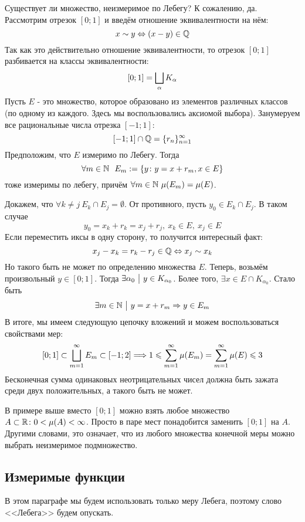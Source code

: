 \begin{example}
	Существует ли множество, неизмеримое по Лебегу? К сожалению, да. Рассмотрим отрезок $[0; 1]$ и введём отношение эквивалентности на нём:
	\[
		x \sim y \Leftrightarrow (x - y) \in \mathbb{Q}
	\]
	Так как это действительно отношение эквивалентности, то отрезок $[0; 1]$ разбивается на классы эквивалентности:
	\[
		[0; 1] = \bigsqcup_{\alpha} K_\alpha
	\]
	Пусть $E$ - это множество, которое образовано из элементов различных классов (по одному из каждого. Здесь мы воспользовались аксиомой выбора). Занумеруем все рациональные числа отрезка $[-1; 1]$:
	\[
		[-1; 1] \cap \mathbb{Q} = \{r_n\}_{n = 1}^\infty
	\]
	Предположим, что $E$ измеримо по Лебегу. Тогда
	\[
		\forall m \in \N\ \ E_m := \{y \colon y = x + r_m, x \in E\}
	\]
	тоже измеримы по лебегу, причём $\forall m \in \mathbb{N}\ \mu(E_m) = \mu(E)$.
	
	Докажем, что $\forall k \neq j\ E_k \cap E_j = \emptyset$. От противного, пусть $y_0 \in E_k \cap E_j$. В таком случае
	\[
		y_0 = x_k + r_k = x_j + r_j,\ x_k \in E,\ x_j \in E
	\]
	Если переместить иксы в одну сторону, то получится интересный факт:
	\[
		x_j - x_k = r_k - r_j \in \mathbb{Q} \Leftrightarrow x_j \sim x_k
	\]
	Но такого быть не может по определению множества $E$. Теперь, возьмём произвольный $y \in [0; 1]$. Тогда $\exists \alpha_0 \ \big|\  y \in K_{\alpha_0}$. Более того, $\exists x \in E \cap K_{\alpha_0}$. Стало быть
	\[
		\exists m \in \mathbb{N} \ \big|\  y = x + r_m \Rightarrow y \in E_m
	\]
	В итоге, мы имеем следующую цепочку вложений и можем воспользоваться свойствами мер:
	\[
		[0; 1] \subset \bigsqcup_{m = 1}^\infty E_m \subset [-1; 2] \Longrightarrow 1 \leqslant \sum_{m = 1}^\infty \mu(E_m) = \sum_{m = 1}^\infty \mu(E) \leqslant 3
	\]
	Бесконечная сумма одинаковых неотрицательных чисел должна быть зажата среди двух положительных, а такого быть не может.
\end{example}

\begin{note}
	В примере выше вместо $[0; 1]$ можно взять любое множество $A \subset \mathbb{R} \colon 0 < \mu(A) < \infty$. Просто в паре мест понадобится заменить $[0; 1]$ на $A$. Другими словами, это означает, что из любого множества конечной меры можно выбрать неизмеримое подмножество.
\end{note}

\subsection{Измеримые функции}

\begin{note}
	В этом параграфе мы будем использовать только меру Лебега, поэтому слово <<Лебега>> будем опускать.
\end{note}

